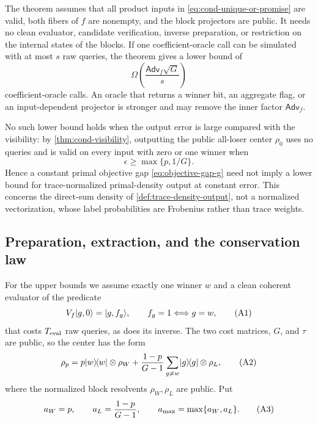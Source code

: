 The theorem assumes that all product inputs in
\eqref{eq:cond-unique-or-promise} are valid, both fibers of $f$ are
nonempty, and the block projectors are public.  It needs no clean evaluator, candidate
verification, inverse preparation, or restriction on the internal states of
the blocks.  If one coefficient-oracle call can be
simulated with at most $s$ raw queries, the theorem gives a lower bound of
\begin{equation}
 \Omega\!\left(\frac{\mathsf{Adv}_f\sqrt G}{s}\right)     \label{eq:cond-coefficient-transfer}
\end{equation}
coefficient-oracle calls.  An oracle that returns a winner bit, an
aggregate flag, or an input-dependent projector is stronger and may remove
the inner factor $\mathsf{Adv}_f$.

No such lower bound holds when the output error is large compared with the
visibility: by \cref{thm:cond-visibility}, outputting the public all-loser
center $\rho_0$ uses no queries and is valid on every input with zero or
one winner when
\begin{equation}
 \epsilon\ge\max\{p,1/G\}.                                \label{eq:cond-zero-query-boundary}
\end{equation}
Hence a constant primal objective gap \eqref{eq:objective-gap-g} need not imply a lower bound for
trace-normalized primal-density output at constant error.  This concerns
the direct-sum density of \cref{def:trace-density-output}, not a normalized
vectorization, whose label probabilities are Frobenius rather than trace
weights.

\subsection{Preparation, extraction, and the conservation law}
\label{sec:condensation-algorithms}

For the upper bounds we assume exactly one winner $w$ and a clean coherent
evaluator of the predicate
\begin{equation*}
 V_f\ket{g,0}=\ket{g,f_g},\qquad f_g=1\Longleftrightarrow g=w,          \condtag{A1}\label{eq:cond-clean-evaluator}
\end{equation*}
that costs $T_{\rm eval}$ raw queries, as does its inverse.  The two cost
matrices, $G$, and $\tau$ are public, so the center has the form
\begin{equation*}
 \rho_p=p\ket w\!\bra w\otimes\rho_W
 +\frac{1-p}{G-1}\sum_{g\ne w}\ket g\!\bra g\otimes\rho_L,            \condtag{A2}\label{eq:cond-central-state}
\end{equation*}
where the normalized block resolvents $\rho_W,\rho_L$ are public.  Put
\begin{equation*}
 a_W=p,\qquad a_L=\frac{1-p}{G-1},\qquad
 a_{\max}=\max\{a_W,a_L\}.                                            \condtag{A3}\label{eq:cond-component-weights}
\end{equation*}

